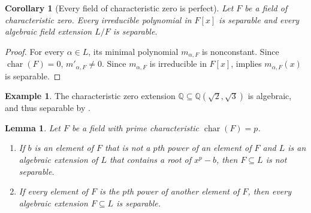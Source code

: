 \documentclass[12pt]{report}
\newtheorem{lemma}[theorem]{Lemma}
\newtheorem{corollary}[theorem]{Corollary}
\numberwithin{equation}{section}
\numberwithin{theorem}{chapter}
\theoremstyle{definition}
\newtheorem{example}[theorem]{Example}
\newtheorem*{basic properties}{Basic Properties}
\newtheorem*{Important Remark}{Important Remark}
\DeclareMathOperator{\ch}{char}
\begin{document}
\begin{corollary}[Every field of characteristic zero is perfect]\label{all separable in char 0}
Let $F$ be a field of characteristic zero. Every irreducible polynomial in $F[x]$ is separable and every algebraic field extension $L/F$ is separable.
\end{corollary}

\begin{proof}
For every $\alpha \in L$, its minimal polynomial $m_{\alpha, F}$ is nonconstant. Since $\ch(F)=0$, $m'_{\alpha, F} \neq 0$. Since $m_{\alpha, F}$ is irreducible in $F[x]$,  implies $m_{\alpha, F}(x)$ is separable.
\end{proof}


\begin{example}
	The characteristic zero extension $\mathbb{Q} \subseteq \mathbb{Q}(\sqrt{2}, \sqrt{3})$ is algebraic, and thus separable by .
\end{example}





\begin{lemma}\label{separable in char p}
Let $F$ be a field with prime characteristic $\ch(F) = p$. 
\begin{enumerate}[label=\alph*),leftmargin=15pt]
\item If $b$ is an element of $F$ that is not a $p$th power of an element of $F$ and $L$ is an algebraic extension of $L$ that contains a root of $x^p - b$, then $F \subseteq L$ is not separable. 
\item If every element of $F$ is the $p$th power of another element of $F$, then every algebraic extension $F \subseteq L$ is separable.
\end{enumerate}
\end{lemma}
\end{document}
